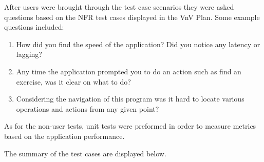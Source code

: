\documentclass[12pt, titlepage]{article}
\begin{document}
\noindent After users were brought through the test case scenarios they were asked questions based on the NFR test cases displayed in the VnV Plan.
Some example questions included: \\
\begin{enumerate}
	\item How did you find the speed of the application? Did you notice any latency or lagging?
	\item Any time the application prompted you to do an action such as find an exercise, was it clear on what to do?
	\item Considering the navigation of this program was it hard to locate various operations and actions from any given point?
\end{enumerate}

\noindent As for the non-user tests, unit tests were preformed in order to measure metrics based on the application performance.

\noindent The summary of the test cases are displayed below.
\end{document}
